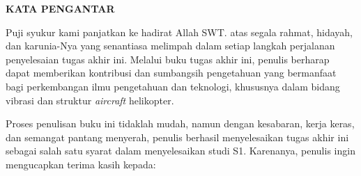 \begin{center}
  \Large
  \textbf{KATA PENGANTAR}
\end{center}


\vspace{2ex}

Puji syukur kami panjatkan ke hadirat Allah SWT. atas segala rahmat, hidayah, dan karunia-Nya yang senantiasa melimpah dalam setiap langkah perjalanan penyelesaian tugas akhir ini. Melalui buku tugas akhir ini, penulis berharap dapat memberikan kontribusi dan sumbangsih pengetahuan yang bermanfaat bagi perkembangan ilmu pengetahuan dan teknologi, khususnya dalam bidang vibrasi dan struktur \textit{aircraft} helikopter. 

Proses penulisan buku ini tidaklah mudah, namun dengan kesabaran, kerja keras, dan semangat pantang menyerah, penulis berhasil menyelesaikan tugas akhir ini sebagai salah satu syarat dalam menyelesaikan studi S1. Karenanya, penulis ingin mengucapkan terima kasih kepada:

